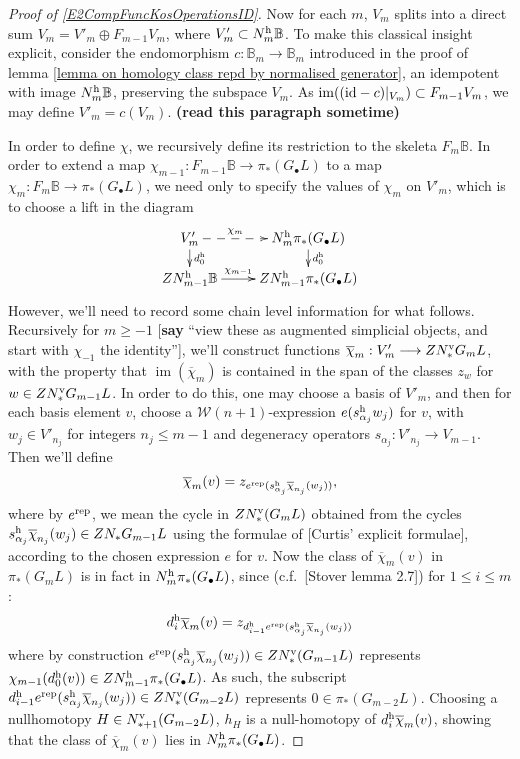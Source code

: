 \documentclass[11pt]{amsart}
\theoremstyle{plain}
\theoremstyle{definition}
\DeclareMathOperator{\im}{im}
\renewcommand{\to}{\longrightarrow}
\newcommand{\calW}{\mathcal{W}}
\theoremstyle{plain}
\begin{document}
\begin{Composite functor spectral sequences}
\begin{proof}[Proof of \ref{E2CompFuncKosOperationsID}]
Now for each $m$, $V_m$ splits into a direct sum
$V_m=V'_m\oplus F_{m-1}V_m$,
where $V'_m\subset N_m^\textup{h}\mathbb{B}$. To make this classical insight explicit, consider the endomorphism $c:\mathbb{B}_m\to \mathbb{B}_m$ introduced in the proof of lemma \ref{lemma on homology class repd by normalised generator}, an idempotent with image $N_m^\textup{h}\mathbb{B}$, preserving the subspace $V_m$. As $\im((\textup{id}-c)|_{V_m})\subset F_{m-1}V_m$, we may define $V'_m=c(V_m)$. \textbf{(read this paragraph sometime)}

In order to define $\chi$, we recursively define its restriction to the skeleta $F_m\mathbb{B}$. In order to extend a map $\chi_{m-1}:F_{m-1}\mathbb{B}\to \pi_*(G_\bullet L)$ to a map $\chi_m:F_m\mathbb{B}\to \pi_*(G_\bullet L)$, we need only to specify the values of $\chi_m$ on $V'_m$, which is to choose a lift in the diagram
\[\xymatrix@R=4mm{
V'_m\ar@{-->}[r]^-{\chi_m}
\ar[d]^-{d_0^\textup{h}}
&%
N^\textup{h}_m\pi_*(G_\bullet L)\ar[d]^-{d_0^\textup{h}}
\\%
ZN^\textup{h}_{m-1}\mathbb{B}\ar[r]^-{\chi_{m-1}}
&%
ZN^\textup{h}_{m-1}\pi_*(G_\bullet L)%
}\]
However, we'll need to record some chain level information for what follows. Recursively for $m\geq-1$ [\textbf{say} ``view these as augmented simplicial objects, and start with $\chi_{-1}$ the identity''], we'll construct functions $\overline{\chi}_m:V'_m\to ZN^\textup{v}_*G_m L$, with the property that $\im(\overline{\chi}_m)$ is contained in the span of the classes $z_{w}$ for $w\in ZN^\textup{v}_*G_{m-1}L$. In order to do this, one may choose a basis of $V'_m$, and then for each basis element $v$, choose a $\calW(n+1)$-expression $e(s^\textup{h}_{\alpha_j}w_j)$ for $v$, with $w_j\in V'_{n_j}$ for integers $n_j\leq m-1$ and degeneracy operators $s_{\alpha_j}:V'_{n_j}\to V_{m-1}$. Then we'll define
\[\overline{\chi}_m(v)=z_{e^\textup{rep}(s^\textup{h}_{\alpha_j}\overline{\chi}_{n_j}(w_j))},\]
where by $e^\textup{rep}$, we mean the cycle in $ZN_*^\textup{v}(G_mL)$ obtained from the cycles $s^\textup{h}_{\alpha_j}\overline{\chi}_{n_j}(w_j)\in ZN_*G_{m-1}L$ using the formulae of [Curtis' explicit formulae], according to the chosen expression $e$ for $v$.
Now the class of $\overline{\chi}_m(v)$ in $\pi_*(G_mL)$ is in fact in $N^\textup{h}_m\pi_*(G_\bullet L)$, since (c.f.\ [Stover lemma 2.7]) for $1\leq i \leq m$:
\[d_i^\textup{h}\overline{\chi}_m(v)=z_{d^\textup{h}_{i-1}e^\textup{rep}(s^\textup{h}_{\alpha_j}\overline{\chi}_{n_j}(w_j))}\]
where by construction $e^\textup{rep}(s^\textup{h}_{\alpha_j}\overline{\chi}_{n_j}(w_j))\in ZN^\textup{v}_*(G_{m-1} L)$ represents $\chi_{m-1}(d_{0}^\textup{h}(v))\in ZN_{m-1}^\textup{h}\pi_*(G_{\bullet} L)$. As such, the subscript $d^\textup{h}_{i-1}e^\textup{rep}(s^\textup{h}_{\alpha_j}\overline{\chi}_{n_j}(w_j))\in ZN^\textup{v}_*(G_{m-2} L)$ represents $0\in\pi_*(G_{m-2}L)$. Choosing a nullhomotopy $H\in N^\textup{v}_{*+1}(G_{m-2}L)$, $h_H$ is a null-homotopy of $d_i^\textup{h}\overline{\chi}_m(v)$, showing that the class of  $\overline{\chi}_m(v)$ lies in $N^\textup{h}_m\pi_*(G_\bullet L)$.

\end{proof}
\end{Composite functor spectral sequences}
\end{document}
